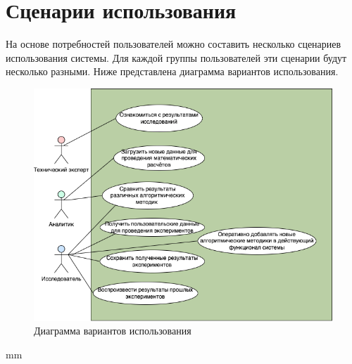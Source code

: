 \section{\Large{Сценарии использования}}

На основе потребностей пользователей можно составить несколько сценариев использования системы.
Для каждой группы пользователей эти сценарии будут несколько разными.
Ниже представлена диаграмма вариантов использования.


\begin{figure}[H]
	\hspace*{-2.5 cm}\includegraphics[width=\textwidth, left]{analysis/pictures/usecases/use-case}
	\caption{Диаграмма вариантов использования}
	\label{pic:architecture__use-case-diagram}
\end{figure}
 mm
